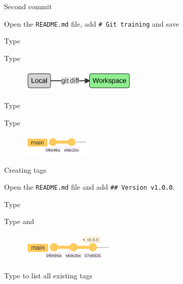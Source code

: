 \documentclass[10pt]{beamer}
\begin{document}
\begin{frame}[fragile]{Second commit}
\protect\hypertarget{second-commit}{}

Open the \texttt{README.md} file, add \texttt{\#\ Git\ training} and
save

Type 

Type 

\begin{figure}[H]

{\centering \includegraphics[width=0.5\textwidth]{mermaid/mermaid-figure-23.png}

}

\end{figure}

Type 

Type 

\begin{figure}[H]

{\centering \includegraphics[width=0.3\textwidth]{mermaid/mermaid-figure-22.png}

}

\end{figure}
\end{frame}

\begin{frame}[fragile]{Creating tags}
\protect\hypertarget{creating-tags}{}

Open the \texttt{README.md} file and add
\texttt{\#\#\ Version\ v1.0.0}.

Type 

Type  and 

\begin{figure}[H]

{\centering \includegraphics[width=0.4\textwidth]{mermaid/mermaid-figure-21.png}

}

\end{figure}

Type  to list all existing tags
\end{frame}
\end{document}
